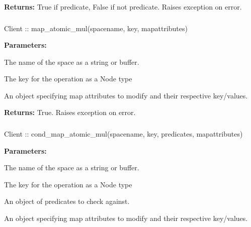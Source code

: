\noindent\textbf{Returns:}
True if predicate, False if not predicate.  Raises exception on error.

\subsubsection{}
\label{api:nodejs:map_atomic_mul}
\begin{javascriptcode}
Client :: map_atomic_mul(spacename, key, mapattributes)
\end{javascriptcode}
\funcdesc 

\noindent\textbf{Parameters:}
\begin{description}[labelindent=\widthof{{\code{mapattributes}}},leftmargin=*,noitemsep,nolistsep,align=right]
\item[\code{spacename}] The name of the space as a string or buffer.
\item[\code{key}] The key for the operation as a Node type
\item[\code{mapattributes}] An object specifying map attributes to modify and their respective key/values.
\end{description}

\noindent\textbf{Returns:}
True.  Raises exception on error.

\subsubsection{}
\label{api:nodejs:cond_map_atomic_mul}
\begin{javascriptcode}
Client :: cond_map_atomic_mul(spacename, key, predicates, mapattributes)
\end{javascriptcode}
\funcdesc 

\noindent\textbf{Parameters:}
\begin{description}[labelindent=\widthof{{\code{mapattributes}}},leftmargin=*,noitemsep,nolistsep,align=right]
\item[\code{spacename}] The name of the space as a string or buffer.
\item[\code{key}] The key for the operation as a Node type
\item[\code{predicates}] An object of predicates to check against.
\item[\code{mapattributes}] An object specifying map attributes to modify and their respective key/values.
\end{description}

